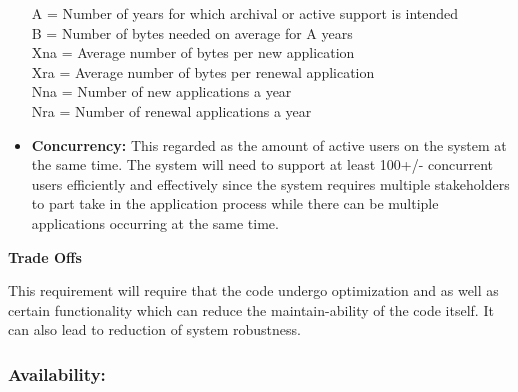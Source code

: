 \begin{flushleft}
\begin{itemize}
A = Number of years for which archival or active support is intended\\
B = Number of bytes needed on average for A years\\
Xna = Average number of bytes per new application\\
Xra = Average number of bytes per renewal application\\
Nna = Number of new applications a year\\
Nra = Number of renewal applications a year\\

\item\textbf{Concurrency:} This regarded as the amount of active users on the system at the same time.
The system will need to support at least 100+/- concurrent users efficiently and effectively since the system requires multiple stakeholders to part take in the application process while there can be multiple applications occurring at the same time.\\

\end{itemize}
\vspace{0.1in}

\textbf{Trade Offs}

This requirement will require that the code undergo optimization and as well as certain functionality which can reduce the maintain-ability of the code itself. It can also lead to reduction of system robustness.

\end{flushleft}
\vspace{0.1in}

\subsubsection{Availability:}

